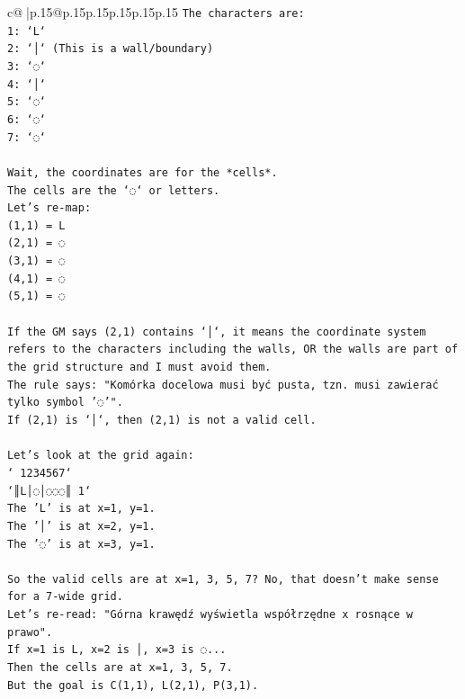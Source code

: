 \documentclass{article}
\begin{document}
{\begin{supertabular}{c@{$\;$}|p{.15\linewidth}@{}p{.15\linewidth}p{.15\linewidth}p{.15\linewidth}p{.15\linewidth}p{.15\linewidth}}
{{{\texttt{The characters are:} \\
\texttt{1: `L`} \\
\texttt{2: `│` (This is a wall/boundary)} \\
\texttt{3: `◌`} \\
\texttt{4: `│`} \\
\texttt{5: `◌`} \\
\texttt{6: `◌`} \\
\texttt{7: `◌`} \\
\\ 
\texttt{Wait, the coordinates are for the *cells*.} \\
\texttt{The cells are the `◌` or letters.} \\
\texttt{Let's re{-}map:} \\
\texttt{(1,1) = L} \\
\texttt{(2,1) = ◌} \\
\texttt{(3,1) = ◌} \\
\texttt{(4,1) = ◌} \\
\texttt{(5,1) = ◌} \\
\\ 
\texttt{If the GM says (2,1) contains `│`, it means the coordinate system refers to the characters including the walls, OR the walls are part of the grid structure and I must avoid them.} \\
\texttt{The rule says: "Komórka docelowa musi być pusta, tzn. musi zawierać tylko symbol '◌'".} \\
\texttt{If (2,1) is `│`, then (2,1) is not a valid cell.} \\
\\ 
\texttt{Let's look at the grid again:} \\
\texttt{` 1234567`} \\
\texttt{`║L│◌│◌◌◌║ 1`} \\
\texttt{The 'L' is at x=1, y=1.} \\
\texttt{The '│' is at x=2, y=1.} \\
\texttt{The '◌' is at x=3, y=1.} \\
\\ 
\texttt{So the valid cells are at x=1, 3, 5, 7? No, that doesn't make sense for a 7{-}wide grid.} \\
\texttt{Let's re{-}read: "Górna krawędź wyświetla współrzędne x rosnące w prawo".} \\
\texttt{If x=1 is L, x=2 is │, x=3 is ◌...} \\
\texttt{Then the cells are at x=1, 3, 5, 7.} \\
\texttt{But the goal is C(1,1), L(2,1), P(3,1).} \\
}}}
\end{supertabular}}
\end{document}
